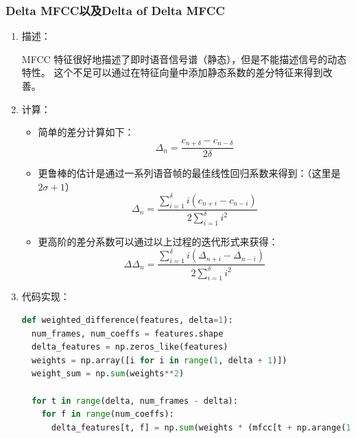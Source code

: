 \documentclass[a4paper]{article}
\begin{document}
\subsubsection{Delta MFCC以及Delta of Delta MFCC}
\begin{enumerate}
  \item 
  {
    描述：

    MFCC 特征很好地描述了即时语音信号谱（静态），但是不能描述信号的动态特性。
    这个不足可以通过在特征向量中添加静态系数的差分特征来得到改善。
  }
  \item 
  {
    计算：
    \begin{itemize}
      \item 简单的差分计算如下：
      \begin{equation}
        \Delta_n = \frac{c_{n+\delta} - c_{n-\delta}}{2\delta}
        \label{eq:Delta1}
      \end{equation}
      \item 更鲁棒的估计是通过一系列语音帧的最佳线性回归系数来得到：（这里是 $2\sigma + 1$）
      \begin{equation}
        \Delta_n = \frac{\sum_{i=1}^{\delta} i (c_{n+i} - c_{n-i})}{2 \sum_{i=1}^{\delta} i^2}
        \label{eq:Delta2}
      \end{equation}
  
      \item 更高阶的差分系数可以通过以上过程的迭代形式来获得：
      \begin{equation}
        \Delta \Delta_n = \frac{\sum_{i=1}^{\delta} i (\Delta_{n+i} - \Delta_{n-i})}{2 \sum_{i=1}^{\delta} i^2}
        \label{eq:delta of delta}
      \end{equation}
  \end{itemize}
  }
  \item 
  {
    代码实现：
    \begin{lstlisting}[language=python]
def weighted_difference(features, delta=1):
  num_frames, num_coeffs = features.shape
  delta_features = np.zeros_like(features)
  weights = np.array([i for i in range(1, delta + 1)])
  weight_sum = np.sum(weights**2)
      
  for t in range(delta, num_frames - delta):
    for f in range(num_coeffs):
      delta_features[t, f] = np.sum(weights * (mfcc[t + np.arange(1, delta + 1), f] - features[t - np.arange(1, delta + 1), f])) / weight_sum
      

\end{lstlisting}}
\end{enumerate}
\end{document}
